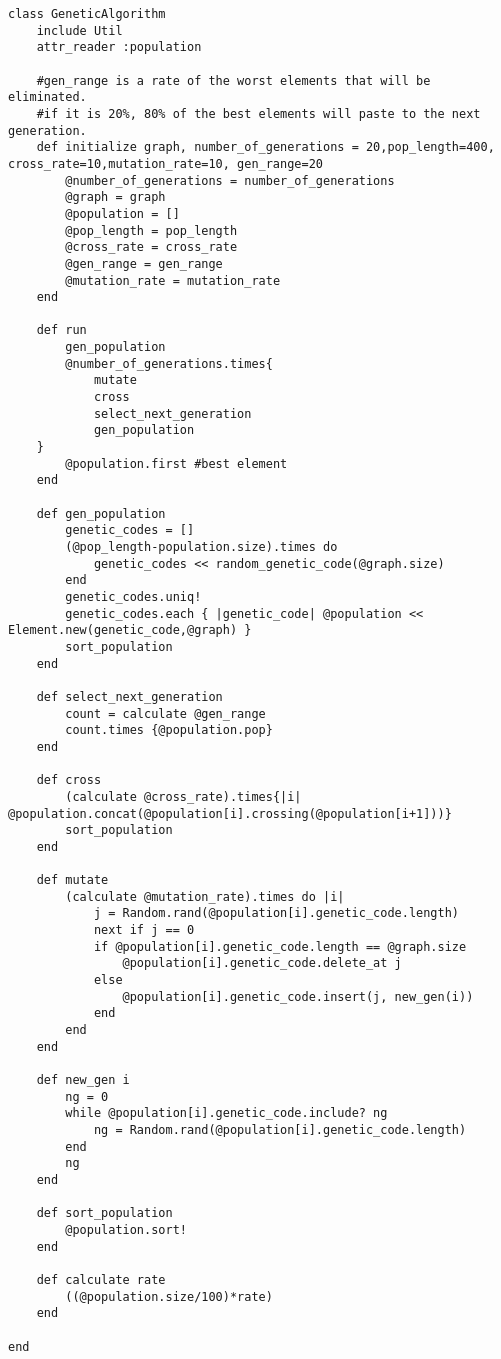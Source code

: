 
\begin{verbatim}
class GeneticAlgorithm
	include Util
	attr_reader :population
	
	#gen_range is a rate of the worst elements that will be eliminated.
	#if it is 20%, 80% of the best elements will paste to the next generation.
	def initialize graph, number_of_generations = 20,pop_length=400, cross_rate=10,mutation_rate=10, gen_range=20
		@number_of_generations = number_of_generations
		@graph = graph
		@population = []
		@pop_length = pop_length
		@cross_rate = cross_rate
		@gen_range = gen_range
		@mutation_rate = mutation_rate
	end

	def run
		gen_population
		@number_of_generations.times{
			mutate
			cross
			select_next_generation
			gen_population
	}
		@population.first #best element
	end

	def gen_population
		genetic_codes = []
		(@pop_length-population.size).times do 
			genetic_codes << random_genetic_code(@graph.size)
		end
		genetic_codes.uniq!
		genetic_codes.each { |genetic_code| @population << Element.new(genetic_code,@graph) }
		sort_population
	end

	def select_next_generation
		count = calculate @gen_range
		count.times {@population.pop}
	end

	def cross
		(calculate @cross_rate).times{|i| @population.concat(@population[i].crossing(@population[i+1]))}
		sort_population
	end

	def mutate
		(calculate @mutation_rate).times do |i|
			j = Random.rand(@population[i].genetic_code.length)
			next if j == 0
			if @population[i].genetic_code.length == @graph.size
				@population[i].genetic_code.delete_at j
			else
				@population[i].genetic_code.insert(j, new_gen(i))
			end
		end
	end

	def new_gen i
		ng = 0
		while @population[i].genetic_code.include? ng
			ng = Random.rand(@population[i].genetic_code.length)
		end
		ng
	end

	def sort_population
		@population.sort!
	end

	def calculate rate
		((@population.size/100)*rate)
	end

end
\end{verbatim}